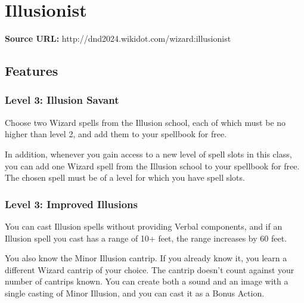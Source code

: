 \documentclass{article}
\begin{document}

\section*{ Illusionist }

\textbf{Source URL:} http://dnd2024.wikidot.com/wizard:illusionist

\vspace{1em}







\subsection*{Features}

\subsubsection*{ Level 3: Illusion Savant }

Choose two Wizard spells from the Illusion school, each of which must be no higher than level 2, and add them to your spellbook for free.

In addition, whenever you gain access to a new level of spell slots in this class, you can add one Wizard spell from the Illusion school to your spellbook for free. The chosen spell must be of a level for which you have spell slots.

\vspace{1em}

\subsubsection*{ Level 3: Improved Illusions }

You can cast Illusion spells without providing Verbal components, and if an Illusion spell you cast has a range of 10+ feet, the range increases by 60 feet.

You also know the Minor Illusion cantrip. If you already know it, you learn a different Wizard cantrip of your choice. The cantrip doesn’t count against your number of cantrips known. You can create both a sound and an image with a single casting of Minor Illusion, and you can cast it as a Bonus Action.
\end{document}
